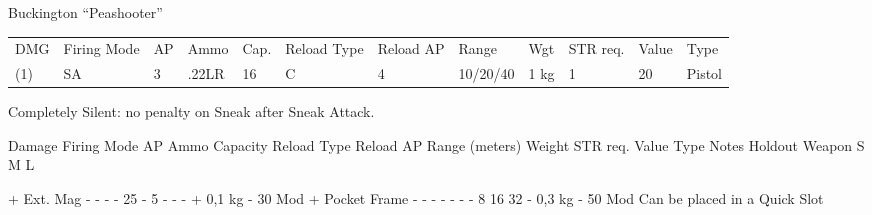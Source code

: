 \documentclass[11pt,a4paper,twocolumn]{book}
\begin{document}
	{
		Buckington ``Peashooter''
		
		\begin{tabu} to 150mm{| X[c,2] | X[c,2] | X[c,1] | X[c,2] | X[c,1] | X[c,2] | X[c,2] | X[c,3] | X[c,1] | X[c,1] | X[c,1] | X[c,1] |}
			\hline
			DMG & Firing Mode & AP & Ammo & Cap. & Reload Type & Reload AP & Range & Wgt & STR req. & Value & Type \\
			(1) &	SA &	3	& .22LR  &	16 &	C	 &4 &	10/20/40 &	1 kg &	1 &	20 &	Pistol 
		\end{tabu}
	}
	Completely Silent: no penalty on Sneak after Sneak Attack.
	
	\bigskip
	
	Damage	Firing Mode	AP	Ammo	Capacity	Reload Type	Reload AP	Range (meters)			Weight	STR req.	Value	Type	Notes
	Holdout Weapon								S	M	L					

	+ Ext. Mag	-	-	-	-	25	-	5	-	-	-	+ 0,1 kg	-	30	Mod	
	+ Pocket Frame	-	-	-	-	-	-	-	8	16	32	- 0,3 kg	-	50	Mod	Can be placed in a Quick Slot
	
	
	
	
\end{document}

